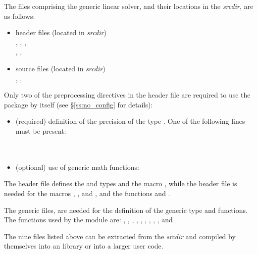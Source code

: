 The files comprising the {\spgmr} generic linear solver, and their locations
in the {\sundials} {\em srcdir}, are as follows:
\begin{itemize}
\item header files (located in {\em srcdir})\\
  , , , \\
  , ,  
\item source files (located in {\em srcdir})\\
  , , 
\end{itemize}
Only two of the preprocessing directives in the header file  
are required to use the {\spgmr} package by itself (see \S\ref{ss:no_config} for details):
\begin{itemize}
\item (required) definition of the precision of the {\sundials} type . 
  One of the following lines must be present:\\
  \\
  \\
\item (optional) use of generic math functions:\\
\end{itemize}
The  header file defines the {\sundials}  and
 types and the macro , while the 
header file is needed for the macros , , and ,
and the functions  and .

The generic {\nvector} files,  are needed for the
definition of the generic  type and functions. 
The {\nvector} functions used by the {\spgmr} module are: 
, , , , , 
, , , , and
.

The nine files listed above can be extracted from the {\sundials} {\em srcdir} and
compiled by themselves into an {\spgmr} library or into a larger user code.
 
